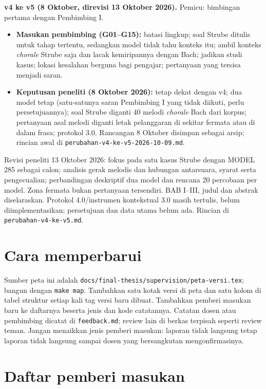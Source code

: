 \documentclass[a4paper,10pt]{article}
\begin{document}
\textbf{v4 ke v5 (8 Oktober, direvisi 13 Oktober 2026).} Pemicu: bimbingan pertama dengan Pembimbing I.
\begin{itemize}
  \item \textcolor{pembimbing}{\textbf{Masukan pembimbing (G01--G15):}} batasi lingkup; soal Strube ditulis untuk tahap tertentu, sedangkan model tidak tahu konteks itu; ambil konteks \textit{chorale} Strube saja dan lacak kemiripannya dengan Bach; jadikan studi kasus; lokasi kesalahan berguna bagi pengajar; pertanyaan yang tersisa menjadi saran.
  \item \textcolor{peneliti}{\textbf{Keputusan peneliti (8 Oktober 2026):}} tetap dekat dengan v4; dua model tetap (satu-satunya saran Pembimbing I yang tidak diikuti, perlu persetujuannya); soal Strube diganti 40 melodi \textit{chorale} Bach dari korpus; pertanyaan asal melodi diganti letak pelanggaran di sekitar fermata atau di dalam frasa; protokol 3.0. Rancangan 8 Oktober disimpan sebagai arsip; rincian awal di \texttt{perubahan-v4-ke-v5-2026-10-09.md}.
\end{itemize}

Revisi peneliti 13 Oktober 2026: fokus pada satu kasus Strube dengan MODEL 285 sebagai calon; analisis gerak melodis dan hubungan antarsuara, syarat serta pengecualian; perbandingan deskriptif dua model dan rencana 20 percobaan per model. Zona fermata bukan pertanyaan tersendiri. BAB I--III, judul dan abstrak diselaraskan. Protokol 4.0/instrumen kontekstual 3.0 masih tertulis, belum diimplementasikan; persetujuan dan data utama belum ada. Rincian di \texttt{perubahan-v4-ke-v5.md}.

\section{Cara memperbarui}

Sumber peta ini adalah \texttt{docs/final-thesis/supervision/peta-versi.tex}; bangun dengan \texttt{make map}. Tambahkan satu kotak versi di peta dan satu kolom di tabel struktur setiap kali tag versi baru dibuat. Tambahkan pemberi masukan baru ke daftarnya beserta jenis dan kode catatannya. Catatan dosen atau pembimbing dicatat di \texttt{feedback.md}; review lain di berkas terpisah seperti review teman. Jangan menaikkan jenis pemberi masukan: laporan tidak langsung tetap laporan tidak langsung sampai dosen yang bersangkutan mengonfirmasinya.

\newpage
\section{Daftar pemberi masukan}
\end{document}
